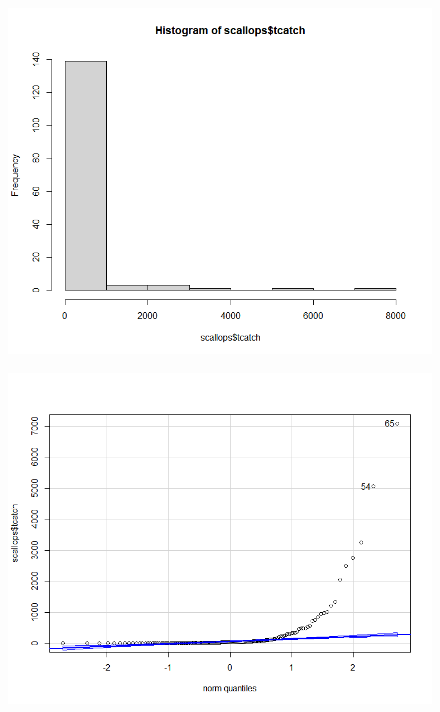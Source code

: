 \documentclass[12pt]{article}
\makeatletter
\theoremstyle{homework}
\newenvironment{exercise}[1]
{\def\@currentlabel{#1}\exercisecore}
{\endexercisecore}
\makeatother
\begin{document}
\begin{exercise}{1}
\begin{enumerate}
    \begin{figure}[H]
      \begin{center}
      \includegraphics[width = .85\textwidth]{Rplot.png}
      \end{center}
    \end{figure}
    \begin{figure}[H]
      \begin{center}
      \includegraphics[width = .85\textwidth]{Rplot01.png}
      \end{center}
    \end{figure}
  \end{enumerate}
\end{exercise}
\vspace{1in}
\end{document}
